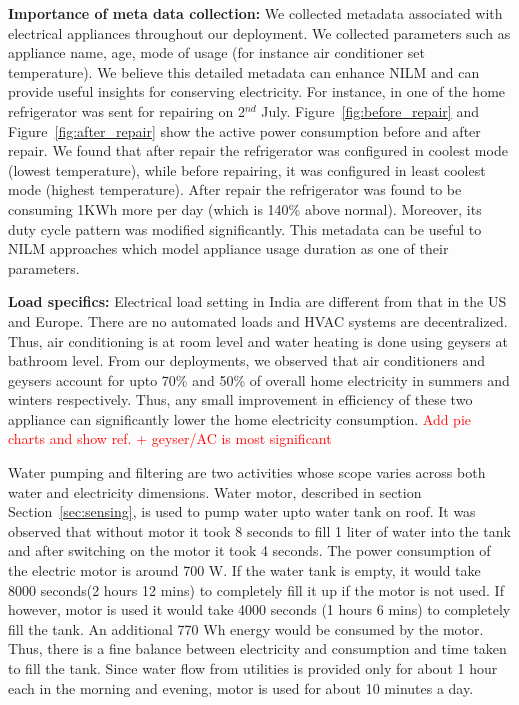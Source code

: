 \documentclass[10pt]{sensys-proc}
\newcommand{\redcolor}[1]{\textcolor{red}{#1}}
\newcommand{\figref}[1]{Figure~\ref{#1}}
\newcommand{\secref}[1]{Section~\ref{#1}}
\begin{document}
\noindent \textbf{Importance of meta data collection:} We collected metadata associated with electrical appliances throughout our deployment. We collected parameters such as appliance name, age, mode of usage (for instance air conditioner set temperature). We believe this detailed metadata can enhance NILM and can provide useful insights for conserving electricity. For instance, in one of the home refrigerator was sent for repairing on 2$^{nd}$ July. \figref{fig:before_repair} and \figref{fig:after_repair} show the active power consumption before and after repair. We found that after repair the refrigerator was configured in coolest mode (lowest temperature), while before repairing, it was configured in least coolest mode (highest temperature). After repair the refrigerator was found to be consuming 1KWh more per day (which is 140\% above normal). Moreover, its duty cycle pattern was modified significantly. This metadata can be useful to NILM approaches which model appliance usage duration as one of their parameters.

\noindent \textbf{Load specifics:} Electrical load setting in India are different from that in the US and Europe. There are no automated loads and HVAC systems are decentralized. Thus, air conditioning is at room level and water heating is done using geysers at bathroom level. From our deployments, we observed that air conditioners and geysers account for upto 70\% and 50\% of overall home electricity in summers and winters respectively. Thus, any small improvement in efficiency of these two appliance can significantly lower the home electricity consumption.
\redcolor{Add pie charts and show ref. + geyser/AC is most significant}

\noindent Water pumping and filtering are two activities whose scope varies across both water and electricity dimensions. Water motor, described in section \secref{sec:sensing}, is used to pump water upto water tank on roof. It was observed that without motor it took 8 seconds to fill 1 liter of water into the tank and after switching on the motor it took 4 seconds. The power consumption of the electric motor is around 700 W. If the water tank is empty, it would take 8000 seconds(2 hours 12 mins) to completely fill it up if the motor is not used. If however, motor is used it would take 4000 seconds (1 hours 6 mins) to completely fill the tank. An additional 770 Wh energy would be consumed by the motor. Thus, there is a fine balance between electricity and consumption and time taken to fill the tank. Since water flow from utilities is provided only for about 1 hour each in the morning and evening, motor is used for about 10 minutes a day.
\end{document}
